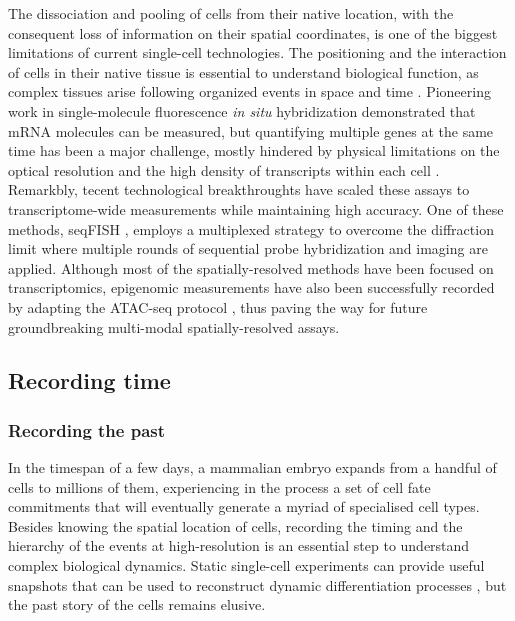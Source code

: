 The dissociation and pooling of cells from their native location, with the consequent loss of information on their spatial coordinates, is one of the biggest limitations of current single-cell technologies. The positioning and the interaction of cells in their native tissue is essential to understand biological function, as complex tissues arise following organized events in space and time \cite{Mayr2019}. Pioneering work in single-molecule fluorescence \textit{in situ} hybridization demonstrated that mRNA molecules can be measured, but quantifying multiple genes at the same time has been a major challenge, mostly hindered by physical limitations on the optical resolution and the high density of transcripts within each cell \cite{Eng2019}. Remarkbly, tecent technological breakthroughts have scaled these assays to transcriptome-wide measurements while maintaining high accuracy. One of these methods, seqFISH \cite{Lubeck2014,Eng2019}, employs a multiplexed strategy to overcome the diffraction limit where multiple rounds of sequential probe hybridization and imaging are applied. Although most of the spatially-resolved methods have been focused on transcriptomics, epigenomic measurements have also been successfully recorded by adapting the ATAC-seq protocol \cite{Thornton2019}, thus paving the way for future groundbreaking multi-modal spatially-resolved assays.

\subsection{Recording time} 

\subsubsection{Recording the past} 

In the timespan of a few days, a mammalian embryo expands from a handful of cells to millions of them, experiencing in the process a set of cell fate commitments that will eventually generate a myriad of specialised cell types. Besides knowing the spatial location of cells, recording the timing and the hierarchy of the events at high-resolution is an essential step to understand complex biological dynamics. Static single-cell experiments can provide useful snapshots that can be used to reconstruct dynamic differentiation processes \cite{Weinreb2018}, but the past story of the cells remains elusive.

